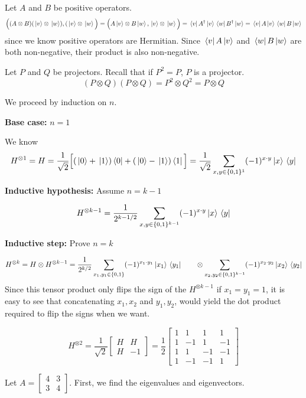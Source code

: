 \exercise
Let $A$ and $B$ be positive operators. 
$$\Big( (A \otimes B)(\ket*{v} \otimes \ket*{w}), (\ket*{v} \otimes \ket*{w} \Big) = \Big( A \ket*{v} \otimes B \ket*{w}, \ket*{v} \otimes \ket*{w} \Big) = \bra*{v} A^{\dagger} \ket*{v} \bra*{w} B^{\dagger} \ket*{w} = \bra*{v} A \ket*{v} \bra*{w} B \ket*{w}$$
since we know positive operators are Hermitian. Since $\bra*{v} A \ket*{v}$ and $\bra*{w} B \ket*{w}$ are both non-negative, their product is also non-negative. 

\exercise
Let $P$ and $Q$ be projectors. Recall that if $P^{2} = P$, $P$ is a projector. 
$$(P \otimes Q)(P \otimes Q) = P^{2} \otimes Q^{2} = P \otimes Q$$

\exercise
We proceed by induction on $n$. 

\textbf{Base case: } $n = 1$

We know $$H^{\otimes 1} = H = \frac{1}{\sqrt{2}} \Big[ (\ket*{0} + \ket*{1})\bra*{0} +  (\ket*{0} - \ket*{1})\bra*{1} \Big] = \frac{1}{\sqrt{2}} \sum_{x, y \in \{ 0, 1 \}^{1}} (-1)^{x \cdot y} \ket*{x} \bra*{y}$$

\textbf{Inductive hypothesis: } Assume $n = k - 1$

$$H^{\otimes k - 1} = \frac{1}{2^{k - 1 / 2}} \sum_{x, y \in \{0, 1\}^{k-1}} (-1)^{x \cdot y} \ket*{x} \bra*{y}$$

\textbf{Inductive step: } Prove $n = k$

$$H^{\otimes k} = H \otimes H^{\otimes k - 1} = \frac{1}{2^{k / 2}} \sum_{x_{1}, y_{1} \in \{0, 1\}} (-1)^{x_{1} \cdot y_{1}} \ket*{x_{1}} \bra*{y_{1}} \qquad \otimes \sum_{x_{2}, y_{2} \in \{ 0, 1\}^{k-1}} (-1)^{x_{2} \cdot y_{2}} \ket*{x_{2}} \bra*{y_{2}}$$
Since this tensor product only flips the sign of the $H^{\otimes k - 1}$ if $x_{1} = y_{1} = 1$, it is easy to see that concatenating $x_{1}, x_{2}$ and $y_{1}, y_{2}$, would yield the dot product required to flip the signs when we want. 

$$H^{\otimes 2} = \frac{1}{\sqrt{2}} \begin{bmatrix}
H & H \\
H & -1
\end{bmatrix} = \frac{1}{2} \begin{bmatrix}
1 & 1 & 1 & 1 \\
1 & -1 & 1 & -1 \\
1 & 1 & -1 & -1 \\
1 & -1 & -1 & 1
\end{bmatrix}$$

\exercise
Let $A = \begin{bmatrix}
4 & 3 \\
3 & 4
\end{bmatrix}$. First, we find the eigenvalues and eigenvectors. 

